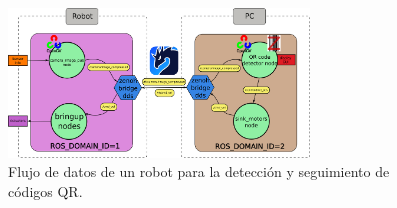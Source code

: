 
\begin{figure} [h!]
  \begin{center}
    \includegraphics[width=8cm]{figs/QR_code_data_flow}
  \end{center}
  \caption{Flujo de datos de un robot para la detección y seguimiento de códigos QR.}
  \label{fig:data_flow}
\end{figure}\








